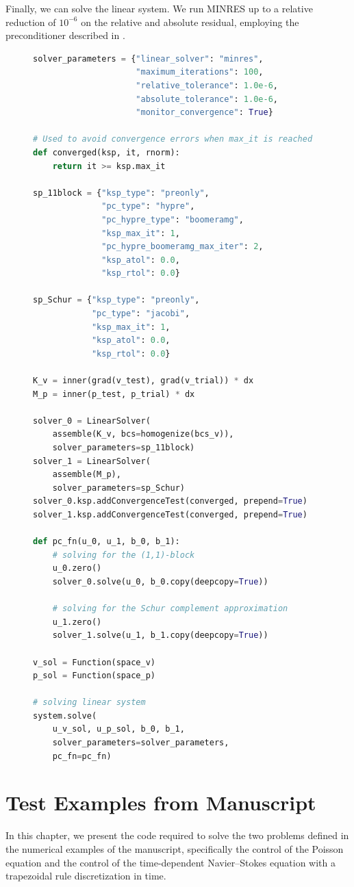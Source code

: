 \documentclass[letterpaper,10pt,english]{sphinxmanual}
\begin{document}
Finally, we can solve the linear system. We run MINRES up to a relative reduction of $10^{-6}$ on the relative and absolute residual, employing the preconditioner described in \cite{Silvester_Wathen}.
\begin{figure}[!h]
\begin{lstlisting}[language=Python]
solver_parameters = {"linear_solver": "minres",
                     "maximum_iterations": 100,
                     "relative_tolerance": 1.0e-6,
                     "absolute_tolerance": 1.0e-6,
                     "monitor_convergence": True}

# Used to avoid convergence errors when max_it is reached
def converged(ksp, it, rnorm):
    return it >= ksp.max_it

sp_11block = {"ksp_type": "preonly",
              "pc_type": "hypre",
              "pc_hypre_type": "boomeramg",
              "ksp_max_it": 1,
              "pc_hypre_boomeramg_max_iter": 2,
              "ksp_atol": 0.0,
              "ksp_rtol": 0.0}

sp_Schur = {"ksp_type": "preonly",
            "pc_type": "jacobi",
            "ksp_max_it": 1,
            "ksp_atol": 0.0,
            "ksp_rtol": 0.0}

K_v = inner(grad(v_test), grad(v_trial)) * dx
M_p = inner(p_test, p_trial) * dx

solver_0 = LinearSolver(
    assemble(K_v, bcs=homogenize(bcs_v)),
    solver_parameters=sp_11block)
solver_1 = LinearSolver(
    assemble(M_p),
    solver_parameters=sp_Schur)
solver_0.ksp.addConvergenceTest(converged, prepend=True)
solver_1.ksp.addConvergenceTest(converged, prepend=True)

def pc_fn(u_0, u_1, b_0, b_1):
    # solving for the (1,1)-block
    u_0.zero()
    solver_0.solve(u_0, b_0.copy(deepcopy=True))

    # solving for the Schur complement approximation
    u_1.zero()
    solver_1.solve(u_1, b_1.copy(deepcopy=True))

v_sol = Function(space_v)
p_sol = Function(space_p)

# solving linear system
system.solve(
    u_v_sol, u_p_sol, b_0, b_1,
    solver_parameters=solver_parameters,
    pc_fn=pc_fn)
\end{lstlisting}
\end{figure}



\chapter{Test Examples from Manuscript}
In this chapter, we present the code required to solve the two problems defined
	in the numerical examples of the manuscript, specifically the control of the Poisson
	equation and the control of the time-dependent Navier--Stokes equation with a
	trapezoidal rule discretization in time.
\end{document}
